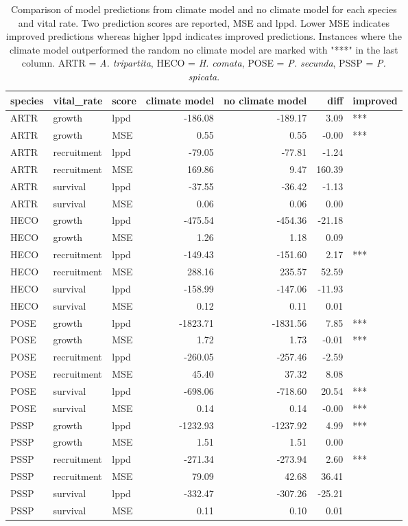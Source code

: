 \documentclass[11pt]{article}
\begin{document}
\begin{table}[ht]
	\centering
	\begin{tabular}{lllrrrl}
		\hline
		species & vital\_rate & score & climate model & no climate model & diff & improved \\ 
		\hline
		ARTR & growth & lppd & -186.08 & -189.17 & 3.09 & *** \\ 
		ARTR & growth & MSE & 0.55 & 0.55 & -0.00 & *** \\ 
		ARTR & recruitment & lppd & -79.05 & -77.81 & -1.24 &  \\ 
		ARTR & recruitment & MSE & 169.86 & 9.47 & 160.39 &  \\ 
		ARTR & survival & lppd & -37.55 & -36.42 & -1.13 &  \\ 
		ARTR & survival & MSE & 0.06 & 0.06 & 0.00 &  \\ 
		HECO & growth & lppd & -475.54 & -454.36 & -21.18 &  \\ 
		HECO & growth & MSE & 1.26 & 1.18 & 0.09 &  \\ 
		HECO & recruitment & lppd & -149.43 & -151.60 & 2.17 & *** \\ 
		HECO & recruitment & MSE & 288.16 & 235.57 & 52.59 &  \\ 
		HECO & survival & lppd & -158.99 & -147.06 & -11.93 &  \\ 
		HECO & survival & MSE & 0.12 & 0.11 & 0.01 &  \\ 
		POSE & growth & lppd & -1823.71 & -1831.56 & 7.85 & *** \\ 
		POSE & growth & MSE & 1.72 & 1.73 & -0.01 & *** \\ 
		POSE & recruitment & lppd & -260.05 & -257.46 & -2.59 &  \\ 
		POSE & recruitment & MSE & 45.40 & 37.32 & 8.08 &  \\ 
		POSE & survival & lppd & -698.06 & -718.60 & 20.54 & *** \\ 
		POSE & survival & MSE & 0.14 & 0.14 & -0.00 & *** \\ 
		PSSP & growth & lppd & -1232.93 & -1237.92 & 4.99 & *** \\ 
		PSSP & growth & MSE & 1.51 & 1.51 & 0.00 &  \\ 
		PSSP & recruitment & lppd & -271.34 & -273.94 & 2.60 & *** \\ 
		PSSP & recruitment & MSE & 79.09 & 42.68 & 36.41 &  \\ 
		PSSP & survival & lppd & -332.47 & -307.26 & -25.21 &  \\ 
		PSSP & survival & MSE & 0.11 & 0.10 & 0.01 &  \\ 
		\hline
	\end{tabular}
	\caption{Comparison of model predictions from climate model and no climate model for each species and vital rate.  Two prediction scores are reported, MSE and lppd. Lower MSE indicates improved predictions whereas higher lppd indicates improved predictions.  Instances where the climate model outperformed the random no climate model are marked with "***" in the last column. ARTR = \textit{A. tripartita}, HECO = \textit{H. comata}, POSE = \textit{P. secunda}, PSSP = \textit{P. spicata}.} 
	\label{table:overallPreds}
\end{table}
\end{document}
